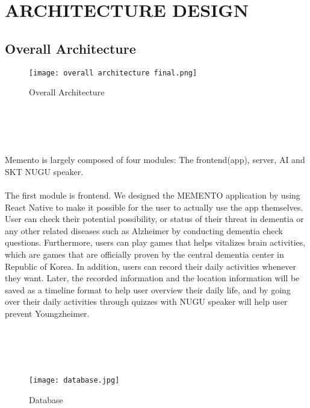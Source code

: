 \documentclass[conference]{IEEEtran}
\begin{document}
\section{ARCHITECTURE DESIGN}
\subsection{Overall Architecture}

\begin{figure}[h]
\centerline{\texttt{[image: overall architecture final.png]}}
\caption{Overall Architecture}
\label{fig}
\end{figure}
\\\\\\\\
Memento is largely composed of four modules: The frontend(app), server, AI and SKT NUGU speaker.\\\\
\indent The first module is frontend. We designed the MEMENTO application by using React Native to make it possible for the user to actually use the app themselves. User can check their potential possibility, or status of their threat in dementia or any other related diseases such as Alzheimer by conducting dementia check questions. Furthermore, users can play games that helps vitalizes brain activities, which are games that are officially proven by the central dementia center in Republic of Korea. In addition, users can record their daily activities whenever they want. Later, the recorded information and the location information will be saved as a timeline format to help user overview their daily life, and by going over their daily activities through quizzes with NUGU speaker will help user prevent Youngzheimer.\\
\\\\\\\\
\begin{figure}[h]
\centerline{\texttt{[image: database.jpg]}}
\caption{Database}
\label{fig}
\end{figure}
\\
\end{document}
